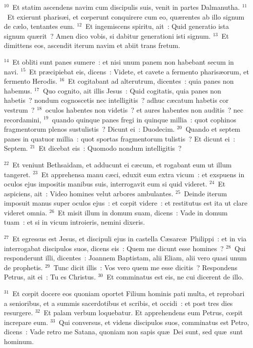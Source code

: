 ${}^{10}$~Et statim ascendens navim cum discipulis suis, venit in partes Dalmanutha.
${}^{11}$~Et exierunt pharis\ae i, et cœperunt conquirere cum eo, qu\ae rentes ab illo signum de c\ae lo, tentantes eum.
${}^{12}$~Et ingemiscens spiritu, ait~: Quid generatio ista signum qu\ae rit~? Amen dico vobis, si dabitur generationi isti signum.
${}^{13}$~Et dimittens eos, ascendit iterum navim et abiit trans fretum.


${}^{14}$~Et obliti sunt panes sumere~: et nisi unum panem non habebant secum in navi.
${}^{15}$~Et pr\ae cipiebat eis, dicens~: Videte, et cavete a fermento pharis\ae orum, et fermento Herodis.
${}^{16}$~Et cogitabant ad alterutrum, dicentes~: quia panes non habemus.
${}^{17}$~Quo cognito, ait illis Jesus~: Quid cogitatis, quia panes non habetis~? nondum cognoscetis nec intelligitis~? adhuc c\ae catum habetis cor vestrum~?
${}^{18}$~oculos habentes non videtis~? et aures habentes non auditis~? nec recordamini,
${}^{19}$~quando quinque panes fregi in quinque millia~: quot cophinos fragmentorum plenos sustulistis~? Dicunt ei~: Duodecim.
${}^{20}$~Quando et septem panes in quatuor millia~: quot sportas fragmentorum tulistis~? Et dicunt ei~: Septem.
${}^{21}$~Et dicebat eis~: Quomodo nondum intelligitis~?


${}^{22}$~Et veniunt Bethsaidam, et adducunt ei c\ae cum, et rogabant eum ut illum tangeret.
${}^{23}$~Et apprehensa manu c\ae ci, eduxit eum extra vicum~: et exspuens in oculos ejus impositis manibus suis, interrogavit eum si quid videret.
${}^{24}$~Et aspiciens, ait~: Video homines velut arbores ambulantes.
${}^{25}$~Deinde iterum imposuit manus super oculos ejus~: et cœpit videre~: et restitutus est ita ut clare videret omnia.
${}^{26}$~Et misit illum in domum suam, dicens~: Vade in domum tuam~: et si in vicum introieris, nemini dixeris.


${}^{27}$~Et egressus est Jesus, et discipuli ejus in castella C\ae sare\ae\ Philippi~: et in via interrogabat discipulos suos, dicens eis~: Quem me dicunt esse homines~?
${}^{28}$~Qui responderunt illi, dicentes~: Joannem Baptistam, alii Eliam, alii vero quasi unum de prophetis.
${}^{29}$~Tunc dicit illis~: Vos vero quem me esse dicitis~? Respondens Petrus, ait ei~: Tu es Christus.
${}^{30}$~Et comminatus est eis, ne cui dicerent de illo.


${}^{31}$~Et cœpit docere eos quoniam oportet Filium hominis pati multa, et reprobari a senioribus, et a summis sacerdotibus et scribis, et occidi~: et post tres dies resurgere.
${}^{32}$~Et palam verbum loquebatur. Et apprehendens eum Petrus, cœpit increpare eum.
${}^{33}$~Qui conversus, et videns discipulos suos, comminatus est Petro, dicens~: Vade retro me Satana, quoniam non sapis qu\ae\ Dei sunt, sed qu\ae\ sunt hominum.


